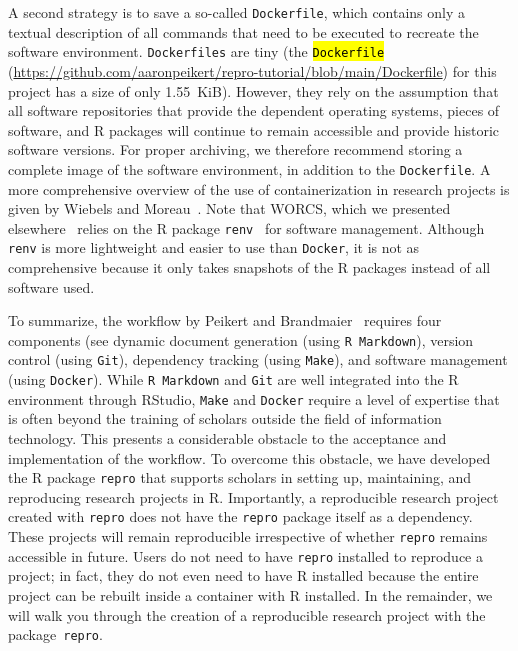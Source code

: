 \documentclass[psych,tutorial,accept,moreauthors,pdftex]{Definitions/mdpi}
\begin{document}
A second strategy is to save a so-called \texttt{Dockerfile}, which
contains only a textual description of all commands that need to be
executed to recreate the software environment. \texttt{Dockerfiles} are
tiny (the \hl{\texttt{Dockerfile}} %
 (\url{https://github.com/aaronpeikert/repro-tutorial/blob/main/Dockerfile})
for this project has a size of only 1.55~KiB). However, they rely on the
assumption that all software repositories that provide the dependent
operating systems, pieces of software, and R packages will continue to
remain accessible and provide historic software versions. For proper
archiving, we therefore recommend storing a complete image of the
software environment, in addition to the \texttt{Dockerfile}. A more
comprehensive overview of the use of containerization in research
projects is given by Wiebels and Moreau~\citep{wiebelsLeveragingContainersReproducible2021}. Note that WORCS,
which we presented elsewhere~\citep{vanlissa2020worcs} relies on the R
package \texttt{renv}~\citep{R-renv} for software management. Although
\texttt{renv} is more lightweight and easier to use than \texttt{Docker}, it is not as comprehensive because it only
takes snapshots of the R packages instead of all software used.

To summarize, the workflow by Peikert and Brandmaier~\citep{Peikert2019} requires four
components (see  %
 dynamic document generation (using
\texttt{R\ Markdown}), version control (using \texttt{Git}), dependency
tracking (using \texttt{Make}), and software management (using
\texttt{Docker}). While \texttt{R\ Markdown} and \texttt{Git} are well
integrated into the R environment through RStudio, \texttt{Make} and
\texttt{Docker} require a level of expertise that is often beyond the
training of scholars outside the field of information technology. This
presents a considerable obstacle to the acceptance and implementation of
the workflow. To overcome this obstacle, we have developed the R package
\texttt{repro} that supports scholars in setting up, maintaining, and
reproducing research projects in R. Importantly, a reproducible research
project created with \texttt{repro} does not have the \texttt{repro}
package itself as a dependency. These projects will remain reproducible
irrespective of whether \texttt{repro} remains accessible in future.
Users do not need to have \texttt{repro} installed to reproduce a
project; in fact, they do not even need to have R installed because the
entire project can be rebuilt inside a container with R installed. In
the remainder, we will walk you through the creation of a reproducible
research project with the package~\texttt{repro}.
\end{document}
